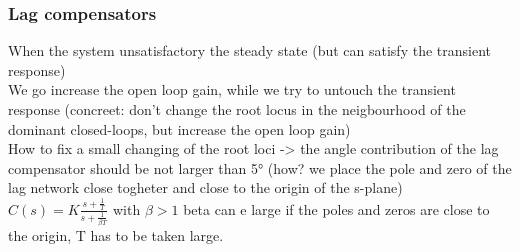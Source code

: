 \begin{frame}
	\frametitle{Lag compensators}
	When the system unsatisfactory the steady state (but can satisfy the transient response)\\
	
	We go increase the open loop gain, while we try to untouch the transient response (concreet: don't change the root locus in the neigbourhood of the dominant closed-loops, but increase the open loop gain)\\
	
	How to fix a small changing of the root loci -> the angle contribution of the lag compensator should be not larger than 5° (how? we place the pole and zero of the lag network close togheter and close to the origin of the s-plane)\\
	
	$C(s)=K\frac{s+\frac{1}{T}}{s+\frac{1}{\beta T}}$ with $\beta>1$ beta can e large if the poles and zeros are close to the origin, T has to be taken large.
\end{frame}